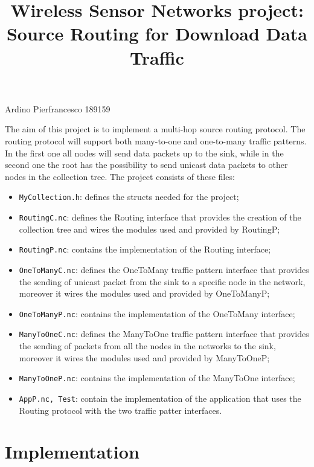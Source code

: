 \documentclass{article}
\begin{document}
\title{Wireless Sensor Networks project: Source Routing for Download Data Traffic}
\maketitle
\begin{center}
Ardino Pierfrancesco 189159\\

    \vspace{1cm}
\end{center}

The aim of this project is to implement a multi-hop source routing protocol. The routing protocol will support both many-to-one and one-to-many traffic patterns. In the first one all nodes will send data packets up to the sink, while in the second one the root has the possibility to send unicast data packets to other nodes in the collection tree.
The project consists of these files:

\begin{itemize}
    \item \texttt{MyCollection.h}: defines the structs needed for the project;
    \item \texttt{RoutingC.nc}: defines the Routing interface that provides the creation of the collection tree and wires the modules used and provided by RoutingP;
    \item \texttt{RoutingP.nc}: contains the implementation of the Routing interface;
    \item \texttt{OneToManyC.nc}: defines the OneToMany traffic pattern interface that provides the sending of unicast packet from the sink to a specific node in the network, moreover it wires the modules used and provided by OneToManyP;
    \item \texttt{OneToManyP.nc}: contains the implementation of the OneToMany interface;
    \item \texttt{ManyToOneC.nc}: defines the ManyToOne traffic pattern interface that provides the sending of packets from all the nodes in the networks to the sink, moreover it wires the modules used and provided by ManyToOneP;
    \item \texttt{ManyToOneP.nc}: contains the implementation of the ManyToOne interface;
    \item \texttt{AppP.nc, Test}: contain the implementation of the application that uses the Routing protocol with the two traffic patter interfaces.
\end{itemize}
\section{Implementation}
\end{document}
